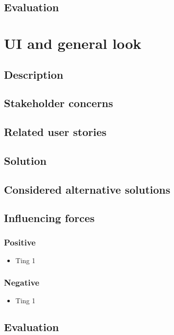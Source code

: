 \documentclass[12pt, a4paper]{article}
\begin{document}
\subsection{Evaluation}

\newpage
\section{UI and general look}
\subsection{Description}

\subsection{Stakeholder concerns}

\subsection{Related user stories}

\subsection{Solution}

\subsection{Considered alternative solutions}

\subsection{Influencing forces}
\begin{minipage}{0.5\textwidth}
    \subsubsection*{Positive}
    \begin{itemize}
        \item Ting 1
    \end{itemize}
\end{minipage}%
\begin{minipage}{0.5\textwidth}
    \subsubsection*{Negative}
    \begin{itemize}
        \item Ting 1
    \end{itemize}
\end{minipage}

\subsection{Evaluation}
\end{document}
